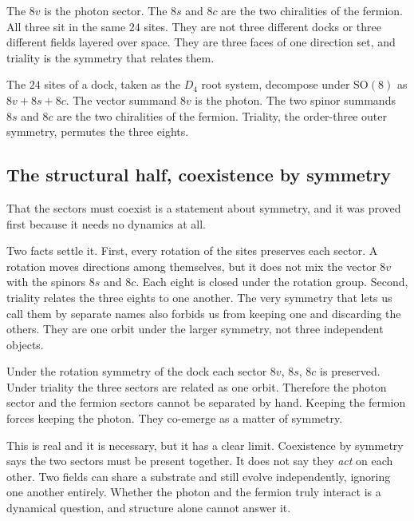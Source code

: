 The $8v$ is the photon sector. The $8s$ and $8c$ are the two chiralities of the fermion. All three sit in the same $24$ sites. They are not three different docks or three different fields layered over space. They are three faces of one direction set, and triality is the symmetry that relates them.

\begin{definition}
The $24$ sites of a dock, taken as the $D_4$ root system, decompose under $\mathrm{SO}(8)$ as $8v + 8s + 8c$. The vector summand $8v$ is the photon. The two spinor summands $8s$ and $8c$ are the two chiralities of the fermion. Triality, the order-three outer symmetry, permutes the three eights.
\end{definition}

\subsection{The structural half, coexistence by symmetry}

That the sectors must coexist is a statement about symmetry, and it was proved first because it needs no dynamics at all.

Two facts settle it. First, every rotation of the sites preserves each sector. A rotation moves directions among themselves, but it does not mix the vector $8v$ with the spinors $8s$ and $8c$. Each eight is closed under the rotation group. Second, triality relates the three eights to one another. The very symmetry that lets us call them by separate names also forbids us from keeping one and discarding the others. They are one orbit under the larger symmetry, not three independent objects.

\begin{proposition}
Under the rotation symmetry of the dock each sector $8v$, $8s$, $8c$ is preserved. Under triality the three sectors are related as one orbit. Therefore the photon sector and the fermion sectors cannot be separated by hand. Keeping the fermion forces keeping the photon. They co-emerge as a matter of symmetry.
\end{proposition}

This is real and it is necessary, but it has a clear limit. Coexistence by symmetry says the two sectors must be present together. It does not say they \emph{act} on each other. Two fields can share a substrate and still evolve independently, ignoring one another entirely. Whether the photon and the fermion truly interact is a dynamical question, and structure alone cannot answer it.


